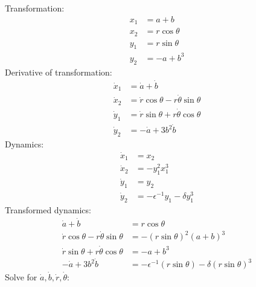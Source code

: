 \documentclass[11pt,reqno]{amsart}
\begin{document}
Transformation:
\begin{equation}
\begin{split}
x_1 &= a + b\\
x_2 &= r\cos\theta\\
y_1 &= r\sin\theta\\
y_2 &= -a + b^3
\end{split}
\end{equation}
Derivative of transformation:
\begin{equation}
\begin{split}
\dot{x}_1 &= \dot{a} +\dot{b}\\
\dot{x}_2 &= \dot{r}\cos\theta -  r\dot{\theta}\sin\theta\\
\dot{y}_1 &= \dot{r}\sin\theta +  r\dot{\theta}\cos\theta\\
\dot{y}_2 &= -\dot{a} + 3b^2\dot{b}
\end{split}
\end{equation}
Dynamics:
\begin{equation}
\begin{split}
\dot{x}_1 &= x_2\\
\dot{x}_2 &= -y_1^2x_1^3\\
\dot{y}_1 &= y_2\\
\dot{y}_2 &= -\epsilon^{-1}y_1 - \delta y_1^3
\end{split}
\end{equation}
Transformed dynamics:
\begin{equation}
\begin{split}
\dot{a} +\dot{b} &=  r\cos\theta\\
\dot{r}\cos\theta -  r\dot{\theta}\sin\theta &= -\left( r\sin\theta\right)^2( a + b)^3\\
\dot{r}\sin\theta +  r\dot{\theta}\cos\theta&=  -a + b^3\\
-\dot{a} + 3b^2\dot{b} &= -\epsilon^{-1}\left( r\sin\theta\right) - \delta \left( r\sin\theta\right)^3
\end{split}
\end{equation}
Solve for $\dot{a},\dot{b},\dot{r},\dot{\theta}$:
\end{document}
